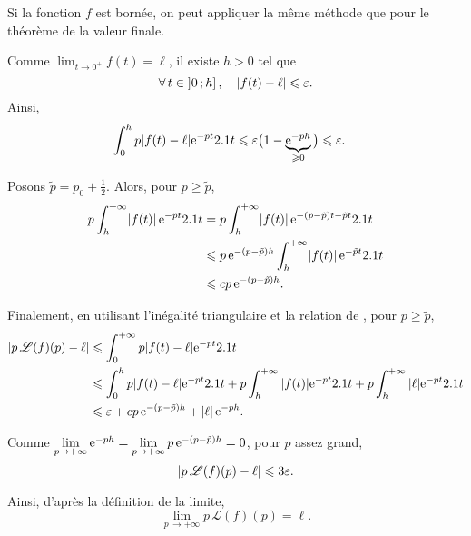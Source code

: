\begin{solution}
\begin{reponses}
\item  Si la fonction $f$ est bornée, on peut appliquer la même méthode que pour le théorème de la valeur finale.

\item Comme $\lim_{t\to0^+} f(t) = \ell$, il existe $h > 0$ tel que
\[
\forall t \in \interof{0}{h},\quad \abs{f(t) - \ell} \leqslant \varepsilon.
\]
Ainsi,
\begin{align*}
\int_0^h p \abs{f(t) - \ell} \mathrm{e}^{-p t} 2.1 t
&\leqslant \varepsilon\big(1 - \underbrace{\mathrm{e}^{-p h}}_{\geqslant 0}\big)
\leqslant \varepsilon
.
\end{align*}

\item Posons $\tilde{p} = p_0 + \frac{1}{2}$. Alors, pour $p \geqslant \tilde{p}$,
\begin{align*}
p \int_h^{+\infty} \mathopen{}\left| f(t) \right| \mathrm{e}^{-p t} 2.1 t
&= p \int_h^{+\infty} \mathopen{}\left| f(t) \right| \mathrm{e}^{-(p - \tilde{p}) t - \tilde{p} t} 2.1 t\\
&\leqslant p\, \mathrm{e}^{-(p-\tilde{p}) h} \int_h^{+\infty} \mathopen{}\left| f(t) \right| \mathrm{e}^{- \tilde{p} t} 2.1 t\\
&\leqslant c p\, \mathrm{e}^{-(p-\tilde{p}) h}.
\end{align*}

\item Finalement, en utilisant l'inégalité triangulaire et la relation de , pour $p \geqslant \tilde{p}$,
\begin{align*}
\abs{p\, \mathscr{L}(f)(p) - \ell}
&\leqslant \int_0^{+\infty} p \abs{f(t) - \ell} \mathrm{e}^{-p t} 2.1 t \\
&\leqslant \int_0^h p \abs{f(t) - \ell} \mathrm{e}^{-pt} 2.1 t
+ p \int_h^{+\infty} \abs{f(t)} \mathrm{e}^{-p t} 2.1 t
+ p \int_h^{+\infty} \abs{\ell} \mathrm{e}^{- p t} 2.1 t \\
&\leqslant \varepsilon + c p\, \mathrm{e}^{-(p-\tilde{p})h} + \mathopen{}\left| \ell \right| \mathrm{e}^{-p h}.
\end{align*}

Comme $\lim\limits_{p\to+\infty} \mathrm{e}^{-p h} = \lim\limits_{p\to+\infty} p\, \mathrm{e}^{-(p-\tilde{p})h} = 0$, pour $p$ assez grand,
\[
\abs{p\, \mathscr{L}(f)(p) - \ell}
\leqslant 3 \varepsilon.
\]

Ainsi, d'après la définition de la limite,
\[
\lim_{p\,\to+\infty} p\, \mathscr{L}(f)(p) = \ell.
\]
\end{reponses}
\end{solution}


